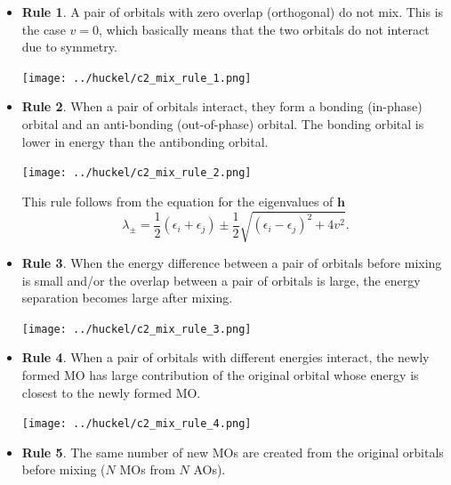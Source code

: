 \documentclass[../Main/chem532-notes.tex]{subfiles}
\begin{document}
\begin{itemize}
\item \textbf{Rule 1}. A pair of orbitals with zero overlap (orthogonal) do not mix. This is the case $v=0$, which basically means that the two orbitals do not interact due to symmetry.

\texttt{[image: ../huckel/c2\_mix\_rule\_1.png]}

\item \textbf{Rule 2}. When a pair of orbitals interact, they form a bonding (in-phase) orbital and an anti-bonding (out-of-phase) orbital. The bonding orbital is lower in energy than the antibonding orbital.

\texttt{[image: ../huckel/c2\_mix\_rule\_2.png]}

This rule follows from the equation for the eigenvalues of $\mathbf{h}$
\begin{equation}
\lambda_\pm = \frac{1}{2} (\epsilon_i + \epsilon_j)
\pm \frac{1}{2} \sqrt{(\epsilon_i - \epsilon_j)^2 + 4 v^2}.
\end{equation}

\item \textbf{Rule 3}.  When the energy difference between a pair of orbitals before mixing is small and/or the overlap between a pair of orbitals is large, the energy separation becomes large after mixing.

\texttt{[image: ../huckel/c2\_mix\_rule\_3.png]}

\item \textbf{Rule 4}.  When a pair of orbitals with different energies interact, the newly formed MO has large contribution of the original orbital whose energy is closest to the newly formed MO.

\begin{center}
\texttt{[image: ../huckel/c2\_mix\_rule\_4.png]}
\end{center}


\item \textbf{Rule 5}. The same number of new MOs are created from the original orbitals before mixing ($N$ MOs from $N$ AOs).


\end{itemize}
\end{document}
